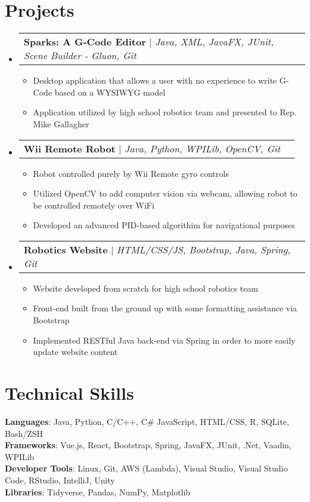 \documentclass[letterpaper,11pt]{article}
\makeatletter
\newcommand{\resumeItem}[1]{
  \item\small{
    {#1 \vspace{-2pt}}
  }
}
\newcommand{\resumeProjectHeading}[2]{
    \item
    \begin{tabular*}{0.97\textwidth}{l@{\extracolsep{\fill}}r}
      \small#1 & #2 \\
    \end{tabular*}\vspace{-7pt}
}
\newcommand{\resumeSubHeadingListStart}{\begin{itemize}[leftmargin=0.15in, label={}]}
\newcommand{\resumeSubHeadingListEnd}{\end{itemize}}
\newcommand{\resumeItemListStart}{\begin{itemize}}
\newcommand{\resumeItemListEnd}{\end{itemize}\vspace{-5pt}}
\makeatother
\begin{document}
\section{{Projects}}
    \resumeSubHeadingListStart
      \resumeProjectHeading
          {\textbf{Sparks: A G-Code Editor} $|$ \emph{Java, XML, JavaFX, JUnit, Scene Builder - Gluon, Git}}{}
          \resumeItemListStart
            \resumeItem{Desktop application that allows a user with no experience to write G-Code based on a WYSIWYG model}
            \resumeItem{Application utilized by high school robotics team and presented to Rep. Mike Gallagher}
          \resumeItemListEnd
      \resumeProjectHeading
          {\textbf{Wii Remote Robot} $|$ \emph{Java, Python, WPILib, OpenCV, Git}}{}
          \resumeItemListStart
            \resumeItem{Robot controlled purely by Wii Remote gyro controls}
            \resumeItem{Utilized OpenCV to add computer vision via webcam, allowing robot to be controlled remotely over WiFi}
            \resumeItem{Developed an advanced PID-based algorithim for navigational purposes}
          \resumeItemListEnd
                \resumeProjectHeading
          {\textbf{Robotics Website} $|$ \emph{HTML/CSS/JS, Bootstrap, Java, Spring, Git}}{}
          \resumeItemListStart
            \resumeItem{Website developed from scratch for high school robotics team}
            \resumeItem{Front-end built from the ground up with some formatting assistance via Bootstrap}
            \resumeItem{Implemented RESTful Java back-end via Spring in order to more easily update website content}
          \resumeItemListEnd
    \resumeSubHeadingListEnd
%
\section{Technical Skills}
 \begin{itemize}[leftmargin=0.15in, label={}]
    \small{
    \item{
     \textbf{Languages}{: Java, Python, C/C++, C\# JavaScript, HTML/CSS, R, SQLite, Bash/ZSH} \\
     \textbf{Frameworks}{: Vue.js, React, Bootstrap, Spring, JavaFX, JUnit, .Net, Vaadin, WPILib} \\
     \textbf{Developer Tools}{: Linux, Git, AWS (Lambda), Visual Studio, Visual Studio Code, RStudio, IntelliJ, Unity} \\
     \textbf{Libraries}{: Tidyverse, Pandas, NumPy, Matplotlib}
    }}
 \end{itemize}


\end{document}
